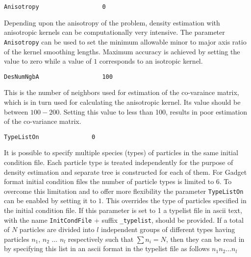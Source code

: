 \documentclass{article}
\begin{document}
\begin{verbatim}
Anisotropy                  0
\end{verbatim}
Depending upon the anisotropy of the 
problem, density estimation with 
anisotropic kernels can be 
computationally very intensive. The 
parameter \verb$Anisotropy$ can be used to
set the minimum allowable minor to major axis ratio of the
kernel smoothing lengths. Maximum 
accuracy is achieved by setting the
value to zero while a value of $1$
corresponds to an isotropic kernel.

\begin{verbatim}
DesNumNgbA                  100
\end{verbatim}
This is the number of neighbors used for 
estimation of the co-varaince matrix, which is 
in turn used for calculating the anisotropic kernel.
Its value should be between $100-200$.  Setting this  value 
to less than 100, results  in poor estimation of the 
co-variance matrix.    




\begin{verbatim}
TypeListOn               0
\end{verbatim}
It is possible to specify multiple species (types) of particles in the same initial 
condition file. Each particle type is treated independently for the purpose 
of density estimation and separate tree is constructed for each of them.
For Gadget format initial condition  files the number of particle types  is limited 
to $6$.  To overcome this limitation and to offer more flexibility  the parameter 
\verb$TypeListOn$ can be enabled by setting it to $1$. This overrides 
the type of particles specified in the initial condition file.
If this parameter is set to 1 a typelist file in ascii text, with the name  \verb$InitCondFile$ + suffix  
\verb$_typelist$, should be provided. 
If a total of $N$ particles are divided into $l$ independent groups of different types 
having particles $n_1$, $n_2$ ...  $n_l$ respectively such that $\sum n_i=N$, then 
they can be read in by specifying this list in an ascii format  in the typelist file as follows
\newline
\newline
$n_1 n_2  ...  n_l $ 
\newline
\end{document}

